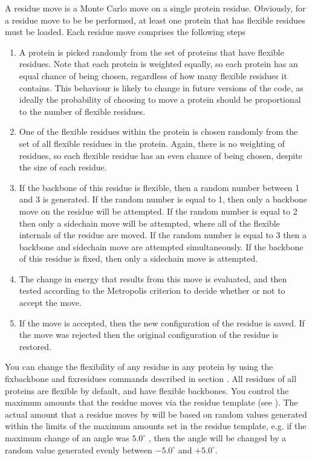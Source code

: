 \documentclass[letterpaper,10pt,english]{sphinxmanual}
\begin{document}
\ignorespaces 
{}
A residue move is a Monte Carlo move on a single protein residue. Obviously, for a residue move to be be performed, at least one protein that has flexible residues must be loaded. Each residue move comprises the following steps
\begin{enumerate}
\item {} 
A protein is picked randomly from the set of proteins that have flexible residues. Note that each protein is weighted equally, so each protein has an equal chance of being chosen, regardless of how many flexible residues it contains. This behaviour is likely to change in future versions of the code, as ideally the probability of choosing to move a protein should be proportional to the number of flexible residues.

\item {} 
One of the flexible residues within the protein is chosen randomly from the set of all flexible residues in the protein. Again, there is no weighting of residues, so each flexible residue has an even chance of being chosen, despite the size of each residue.

\item {} 
If the backbone of this residue is flexible, then a random number between 1 and 3 is generated. If the random number is equal to 1, then only a backbone move on the residue will be attempted. If the random number is equal to 2 then only a sidechain move will be attempted, where all of the flexible internals of the residue are moved. If the random number is equal to 3 then a backbone and sidechain move are attempted simultaneously. If the backbone of this residue is fixed, then only a sidechain move is attempted.

\item {} 
The change in energy that results from this move is evaluated, and then tested according to the Metropolis criterion to decide whether or not to accept the move.

\item {} 
If the move is accepted, then the new configuration of the residue is saved. If the move was rejected then the original configuration of the residue is restored.

\end{enumerate}

You can change the flexibility of any residue in any protein by using the fixbackbone and fixresidues commands described in section {\hyperref[\detokenize{protoms:misccmd}]{}}. All residues of all proteins are flexible by default, and have flexible backbones. You control the maximum amounts that the residue moves via the residue template (see {\hyperref[\detokenize{protoms:temref}]{}}). The actual amount that a residue moves by will be based on random values generated within the limits of the maximum amounts set in the residue template, e.g. if the maximum change of an angle was \(5.0^\circ\) , then the angle will be changed by a random value generated evenly between \(-5.0^\circ\) and \(+5.0^\circ\).
\end{document}
